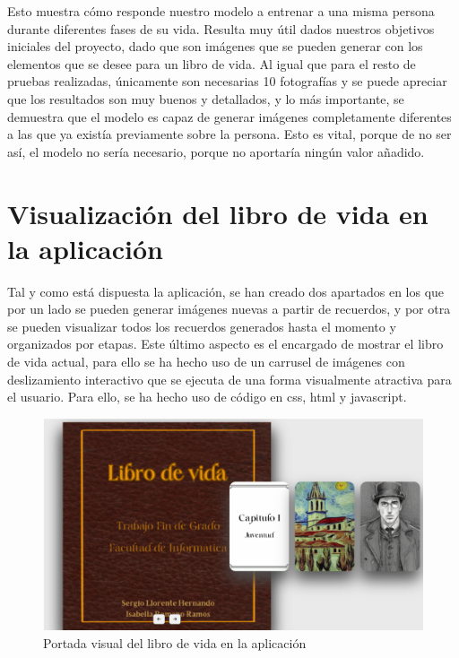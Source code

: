 Esto muestra cómo responde nuestro modelo a entrenar a una misma persona durante diferentes fases de su vida. Resulta muy útil dados nuestros objetivos iniciales del proyecto, dado que son imágenes que se pueden generar con los elementos que se desee para un libro de vida. Al igual que para el resto de pruebas realizadas, únicamente son necesarias 10 fotografías y se puede apreciar que los resultados son muy buenos y detallados, y lo más importante, se demuestra que el modelo es capaz de generar imágenes completamente diferentes a las que ya existía previamente sobre la persona. Esto es vital, porque de no ser así, el modelo no sería necesario, porque no aportaría ningún valor añadido.

\section{Visualización del libro de vida en la aplicación}

Tal y como está dispuesta la aplicación, se han creado dos apartados en los que por un lado se pueden generar imágenes nuevas a partir de recuerdos, y por otra se pueden visualizar todos los recuerdos generados hasta el momento y organizados por etapas. Este último aspecto es el encargado de mostrar el libro de vida actual, para ello se ha hecho uso de un carrusel de imágenes con deslizamiento interactivo que se ejecuta de una forma visualmente atractiva para el usuario. Para ello, se ha hecho uso de código en css, html y javascript. 

\begin{figure}[!htb]
	\centering
	\includegraphics[width = 1
	\textwidth]{Imagenes/Vectorial/librovidaportada.png}
	\caption{Portada visual del libro de vida en la aplicación}
	\label{fig:libroapportada}
\end{figure}


